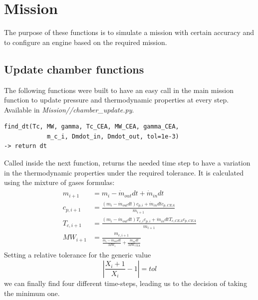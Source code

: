 \newpage
\chapter{Mission}
The purpose of these functions is to simulate a mission with certain accuracy and to configure an engine based on the required mission.
\section{Update chamber functions}
The following functions were built to have an easy call in the main mission function to update pressure and thermodynamic properties at every step. Available in \textit{Mission//chamber\_update.py}.

\begin{verbatim}
find_dt(Tc, MW, gamma, Tc_CEA, MW_CEA, gamma_CEA, 
			m_c_i, Dmdot_in, Dmdot_out, tol=1e-3)
-> return dt
\end{verbatim}
\hspace*{2em} Called inside the next function, returns the needed time step to have a variation in the thermodynamic properties under the required tolerance. It is calculated using the mixture of gases formulas:
\begin{gather}
    \begin{aligned}
        m_{i+1}&=m_i-\dot{m}_{out}dt+\dot{m}_{in}dt\\
        c_{p,i+1}&=\frac{(m_i-\dot{m}_{out}dt)c_{p,i}+\dot{m}_{in}dtc_{p,CEA}}{m_{i+1}}\\
        T_{c,i+1}&=\frac{(m_i-\dot{m}_{out}dt)T_{c,i}c_{p,i}+\dot{m}_{in}dtT_{c,CEA}c_{p,CEA}}{m_{i+1}}\\
        MW_{i+1}&=\frac{m_{c,i+1}}{\frac{m_i-\dot{m}_{out}dt}{MW_i}+\frac{\dot{m}_{in}dt}{MW_{CEA}}}
    \end{aligned}
    \label{Eq: MixGas}
\end{gather}
Setting a relative tolerance for the generic value
\begin{equation}
    |\frac{X_i+1}{X_i}-1|=tol
\end{equation}
we can finally find four different time-steps, leading us to the decision of taking the minimum one.

